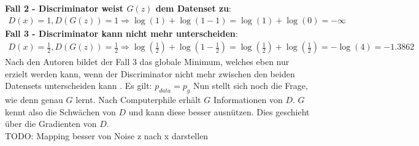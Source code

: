 \textbf{Fall 2 - Discriminator weist $G(z)$ dem Datenset zu}:
\begin{align}
    D(x) = 1, D(G(z)) = 1 \Rightarrow \log(1) + \log(1 - 1) = \log(1) + \log(0) = -\infty
\end{align}
\textbf{Fall 3 - Discriminator kann nicht mehr unterscheiden}:\\
\begin{align}
    D(x) = \frac{1}{2}, D(G(z)) = \frac{1}{2} \Rightarrow \log(\frac{1}{2}) + \log(1 - \frac{1}{2}) = \log(\frac{1}{2}) + \log(\frac{1}{2}) = -\log(4) = -1.3862
\end{align}
Nach den Autoren bildet der Fall 3 das globale Minimum, welches eben nur erzielt werden kann, wenn der Discriminator nicht mehr zwischen
den beiden Datensets unterscheiden kann \cite[p.~4-5]{8253599}. Es gilt: $p_{data} = p_{g}$
\para
Nun stellt sich noch die Frage, wie denn genau $G$ lernt. Nach \glqq Computerphile\grqq{} erhält $G$ Informationen von $D$.
$G$ kennt also die Schwächen von $D$ und kann diese besser ausnützen. Dies geschieht über die Gradienten von $D$. \cite{youtube:gan}
\\TODO: Mapping besser von Noise z nach x darstellen
\newpage
